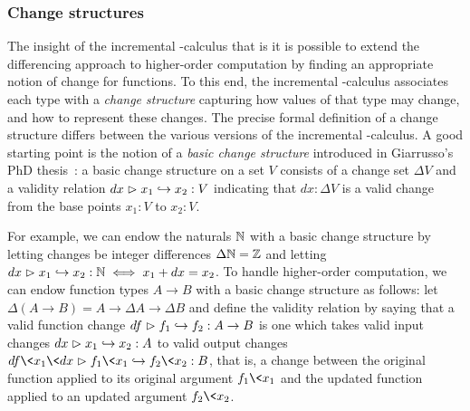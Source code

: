 
\subsubsection{Change structures}

The insight of the incremental \fn-calculus that is it is possible to extend the differencing approach to higher-order computation by finding an appropriate notion of change for functions.
%
To this end, the incremental \fn-calculus associates each type with a \emph{change structure} capturing how values of that type may change, and how to represent these changes.
%
The precise formal definition of a change structure differs between the various versions of the incremental \fn-calculus.
%
A good starting point is the notion of a \emph{basic change structure} introduced in Giarrusso's PhD thesis~\citeyearpar[chapter 12, definition 12.1.1]{DBLP:phd/dnb/Giarrusso20}:
%
a basic change structure on a set $V$ consists of a change set $\Delta V$ and a validity relation $\gvalid{V}{dx}{x_1}{x_2}$ indicating that $dx : \Delta V$ is a valid change from the base points $x_1 : V$ to $x_2 : V$.

For example, we can endow the naturals $\N$ with a basic change structure by
letting changes be integer differences $\Delta \N = \mathbb{Z}$ and letting
$\gvalid{\N}{dx}{x_1}{x_2} \iff x_1 + dx = x_2$.
%
To handle higher-order computation, we can endow function types $A \to B$ with a
basic change structure as follows: let $\Delta(A \to B) = A \to \Delta A \to
\Delta B$ and define the validity relation by saying that a valid function
change $\gvalid{A \to B}{df}{f_1}{f_2}$ is one which takes  valid input changes
$\gvalid{A}{dx}{x_1}{x_2}$ to valid output changes
$\gvalid{B}{df\<x_1\<dx}{f_1\<x_1}{f_2\<x_2}$, that is, a change between the
original function applied to its original argument $f_1\<x_1$ and the updated
function applied to an updated argument $f_2\<x_2$.



